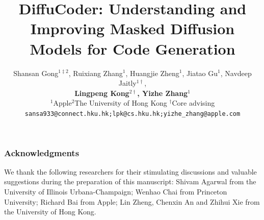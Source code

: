 \documentclass{article} %
\title{DiffuCoder: Understanding and Improving Masked Diffusion Models for Code Generation}
\author{Shansan Gong$^{1\ddagger2}$, Ruixiang Zhang$^1$, Huangjie Zheng$^1$, Jiatao Gu$^1$, Navdeep Jaitly$^{1\dagger}$,\\
\textbf{{Lingpeng Kong}$^{2\dagger}$, {Yizhe Zhang}$^1$} \\
$^1$Apple\quad $^2$The University of Hong Kong {$^\dagger$Core advising}\\
\texttt{sansa933@connect.hku.hk;lpk@cs.hku.hk;yizhe\_zhang@apple.com} \\
}
\begin{document}
\maketitle














\subsubsection*{Acknowledgments}
We thank the following researchers for their stimulating discussions and valuable suggestions during the preparation of this manuscript: Shivam Agarwal from the University of Illinois Urbana-Champaign; Wenhao Chai from Princeton University; Richard Bai from Apple; Lin Zheng, Chenxin An and Zhihui Xie from the University of Hong Kong.




\newpage
\appendix

\end{document}
